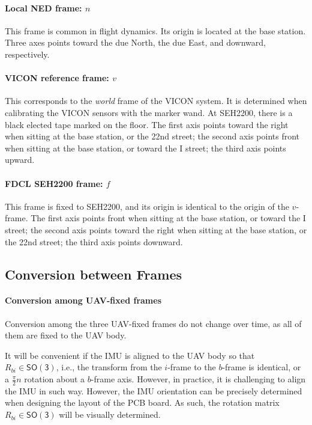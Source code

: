 \documentclass[11pt]{article}
\newcommand{\SO}{\ensuremath{\mathsf{SO(3)}}}
\begin{document}
\paragraph{Local NED frame: $n$} This frame is common in flight dynamics. Its origin is located at the base station. Three axes points toward the due North, the due East, and downward, respectively. 

\paragraph{VICON reference frame: $v$} This corresponds to the \textit{world} frame of the VICON system. It is determined when calibrating the VICON sensors with the marker wand. At SEH2200, there is a black elected tape marked on the floor. The first axis points toward the right when sitting at the base station, or the 22nd street; the second axis points front when sitting at the base station, or toward the I street; the third axis points upward.

\paragraph{FDCL SEH2200 frame: $f$} This frame is fixed to SEH2200, and its origin is identical to the origin of the $v$-frame. The first axis points front when sitting at the base station, or toward the I street; the second axis points toward the right when sitting at the base station, or the 22nd street; the third axis points downward. 


\subsection{Conversion between Frames}

\paragraph{Conversion among UAV-fixed frames}

Conversion among the three UAV-fixed frames do not change over time, as all of them are fixed to the UAV body. 

It will be convenient if the IMU is aligned to the UAV body so that $R_{bi}\in\SO$, i.e., the transform from the $i$-frame to the $b$-frame is identical, or a $\frac{\pi}{2}n$ rotation about a $b$-frame axis. However, in practice, it is challenging to align the IMU in such way. However, the IMU orientation can be precisely determined when designing the layout of the PCB board. As such, the rotation matrix $R_{bi}\in\SO$ will be visually determined. 
\end{document}
